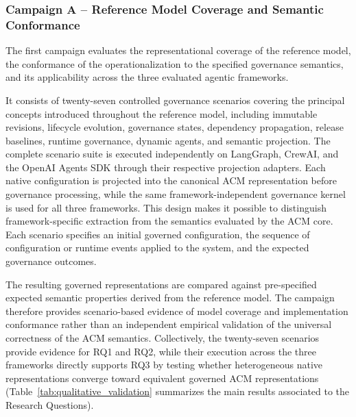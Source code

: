 \documentclass[10pt]{article}
\begin{document}
\subsubsection{Campaign A -- Reference Model Coverage and Semantic Conformance}

The first campaign evaluates the representational coverage of the reference model, the conformance of the operationalization to the specified governance semantics, and its applicability across the three evaluated agentic frameworks.

It consists of twenty-seven controlled governance scenarios covering the principal concepts introduced throughout the reference model, including immutable revisions, lifecycle evolution, governance states, dependency propagation, release baselines, runtime governance, dynamic agents, and semantic projection. The complete scenario suite is executed independently on LangGraph, CrewAI, and the OpenAI Agents SDK through their respective projection adapters. Each native configuration is projected into the canonical ACM representation before governance processing, while the same framework-independent governance kernel is used for all three frameworks. This design makes it possible to distinguish framework-specific extraction from the semantics evaluated by the ACM core. Each scenario specifies an initial governed configuration, the sequence of configuration or runtime events applied to the system, and the expected governance outcomes. 

The resulting governed representations are compared against pre-specified expected semantic properties derived from the reference model. The campaign therefore provides scenario-based evidence of model coverage and implementation conformance rather than an independent empirical validation of the universal correctness of the ACM semantics. Collectively, the twenty-seven scenarios provide evidence for RQ1 and RQ2, while their execution across the three frameworks directly supports RQ3 by testing whether heterogeneous native representations converge toward equivalent governed ACM representations (Table~\ref{tab:qualitative_validation} summarizes the main results associated to the Research Questions). 
\end{document}
